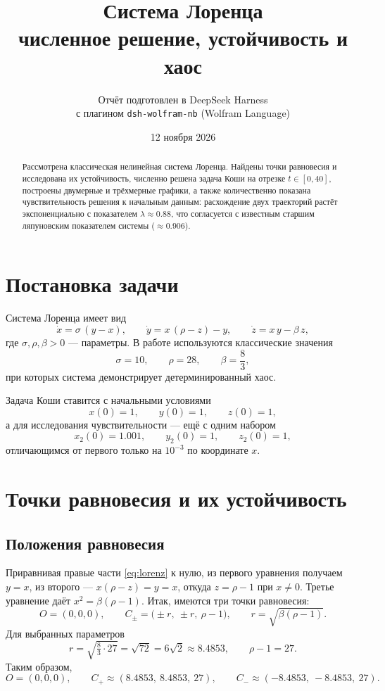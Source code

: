 \documentclass[11pt]{article}
\title{\textbf{Система Лоренца}\\[0.25em]
\large численное решение, устойчивость и хаос}
\author{Отчёт подготовлен в DeepSeek Harness\\с плагином \texttt{dsh-wolfram-nb} (Wolfram Language)}
\date{12 ноября 2026}
\begin{document}
\maketitle

\begin{abstract}
Рассмотрена классическая нелинейная система Лоренца. Найдены точки равновесия и исследована их
устойчивость, численно решена задача Коши на отрезке $t\in[0,40]$, построены двумерные и
трёхмерные графики, а также количественно показана чувствительность решения к начальным данным:
расхождение двух траекторий растёт экспоненциально с показателем $\lambda\approx0.88$,
что согласуется с известным старшим ляпуновским показателем системы ($\approx0.906$).
\end{abstract}

\section{Постановка задачи}

Система Лоренца имеет вид
\begin{equation}
\dot{x}=\sigma\,(y-x),\qquad
\dot{y}=x\,(\rho-z)-y,\qquad
\dot{z}=x\,y-\beta\,z,
\label{eq:lorenz}
\end{equation}
где $\sigma,\rho,\beta>0$ --- параметры. В работе используются классические значения
\[
\sigma=10,\qquad \rho=28,\qquad \beta=\frac{8}{3},
\]
при которых система демонстрирует детерминированный хаос.

Задача Коши ставится с начальными условиями
\[
x(0)=1,\qquad y(0)=1,\qquad z(0)=1,
\]
а для исследования чувствительности --- ещё с одним набором
\[
x_2(0)=1.001,\qquad y_2(0)=1,\qquad z_2(0)=1,
\]
отличающимся от первого только на $10^{-3}$ по координате $x$.

\section{Точки равновесия и их устойчивость}

\subsection{Положения равновесия}

Приравнивая правые части \eqref{eq:lorenz} к нулю, из первого уравнения получаем $y=x$,
из второго --- $x(\rho-z)=y=x$, откуда $z=\rho-1$ при $x\ne0$. Третье уравнение даёт
$x^{2}=\beta(\rho-1)$. Итак, имеются три точки равновесия:
\[
O=(0,0,0),\qquad
C_{\pm}=\bigl(\pm r,\ \pm r,\ \rho-1\bigr),
\qquad r=\sqrt{\beta(\rho-1)}.
\]
Для выбранных параметров
\[
r=\sqrt{\tfrac{8}{3}\cdot 27}=\sqrt{72}=6\sqrt{2}\approx 8.4853,
\qquad \rho-1=27.
\]
Таким образом,
\[
O=(0,0,0),\qquad
C_{+}\approx(8.4853,\ 8.4853,\ 27),\qquad
C_{-}\approx(-8.4853,\ -8.4853,\ 27).
\]
\end{document}
